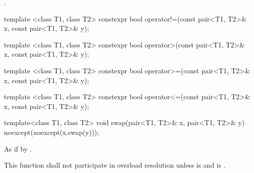 \begin{itemdescr}
\pnum
\returns
{}.
\end{itemdescr}

%
\begin{itemdecl}
template <class T1, class T2>
  constexpr bool operator!=(const pair<T1, T2>& x, const pair<T1, T2>& y);
\end{itemdecl}

\begin{itemdescr}
\pnum
\returns {}
\end{itemdescr}

%
\begin{itemdecl}
template <class T1, class T2>
  constexpr bool operator>(const pair<T1, T2>& x, const pair<T1, T2>& y);
\end{itemdecl}

\begin{itemdescr}
\pnum
\returns {}
\end{itemdescr}

%
\begin{itemdecl}
template <class T1, class T2>
  constexpr bool operator>=(const pair<T1, T2>& x, const pair<T1, T2>& y);
\end{itemdecl}

\begin{itemdescr}
\pnum
\returns {}
\end{itemdescr}

%
\begin{itemdecl}
template <class T1, class T2>
  constexpr bool operator<=(const pair<T1, T2>& x, const pair<T1, T2>& y);
\end{itemdecl}

\begin{itemdescr}
\pnum
\returns {}
\end{itemdescr}


%
\begin{itemdecl}
template<class T1, class T2> void swap(pair<T1, T2>& x, pair<T1, T2>& y)
  noexcept(noexcept(x.swap(y)));
\end{itemdecl}

\begin{itemdescr}
\pnum
\effects As if by .

\pnum
\remarks
This function shall not participate in overload resolution unless
 is  and
 is .
\end{itemdescr}

